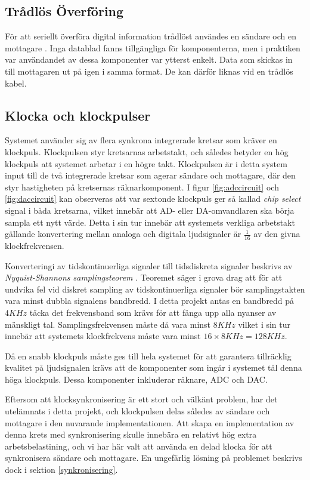 \documentclass[a4paper,10pt]{article}
\begin{document}
\subsection{Trådlös Överföring}
För att seriellt överföra digital information trådlöst användes en sändare och en mottagare . Inga datablad fanns tillgängliga för komponenterna, men i praktiken var användandet av dessa komponenter var ytterst enkelt. Data som skickas in till mottagaren ut på igen i samma format. De kan därför liknas vid en trådlös kabel.

\subsection{Klocka och klockpulser}

Systemet använder sig av flera synkrona integrerade kretsar som kräver en
klockpuls. Klockpulsen styr kretsarnas arbetstakt, och således betyder en hög klockpuls att systemet arbetar i en högre takt. Klockpulsen är i detta system input till de två integrerade kretsar som agerar sändare och mottagare, där den styr hastigheten på kretsernas räknarkomponent. I figur \ref{fig:adccircuit} och \ref{fig:daccircuit} kan observeras att var sextonde klockpuls ger så kallad \textit{chip select} signal i båda kretsarna, vilket innebär att AD- eller DA-omvandlaren ska börja sampla ett nytt värde. Detta i sin tur innebär att systemets verkliga arbetstakt gällande konvertering mellan analoga och digitala ljudsignaler är $\frac{1}{16}$ av den givna klockfrekvensen.

Konverteringi av tidskontinuerliga signaler till tidsdiskreta signaler beskrivs av \textit{Nyquist-Shannons samplingsteorem} \cite{sampling}. Teoremet säger i grova drag att för att undvika fel vid diskret sampling av tidskontinuerliga signaler bör samplingstakten vara minst dubbla signalens bandbredd. I detta projekt antas en bandbredd på $4KHz$ täcka det frekvensband som krävs för att fånga upp alla nyanser av mänskligt tal. Samplingsfrekvensen måste då vara minst $8KHz$ vilket i sin tur innebär att systemets klockfrekvens måste vara minst $16 \times 8KHz = 128KHz$.

Då en snabb klockpuls måste ges till hela systemet för att garantera tillräcklig kvalitet på ljudsignalen krävs att de komponenter som ingår i systemet tål denna höga klockpuls. Dessa komponenter inkluderar räknare, ADC och DAC.

Eftersom att klocksynkronisering är ett stort och välkänt problem, har det 
utelämnats i detta projekt, och klockpulsen delas således av sändare och 
mottagare i den nuvarande implementationen. Att skapa en implementation av denna krets med synkronisering skulle innebära en relativt hög extra arbetsbelastining, och vi har här valt att använda en delad klocka för att synkronisera sändare och mottagare. En ungefärlig lösning på problemet beskrivs dock i sektion \ref{synkronisering}.
\end{document}
